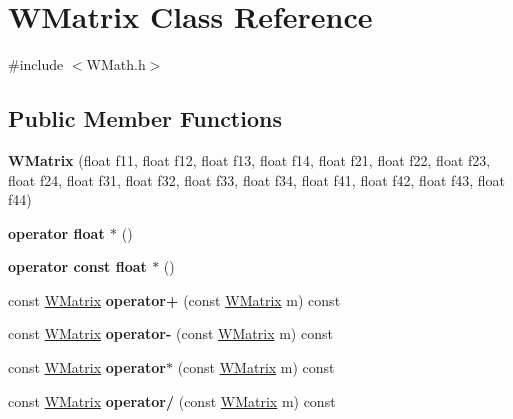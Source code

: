 \hypertarget{class_w_matrix}{}\section{W\+Matrix Class Reference}
\label{class_w_matrix}


{\ttfamily \#include $<$W\+Math.\+h$>$}

\subsection*{Public Member Functions}
\begin{DoxyCompactItemize}
\item 
{\bfseries W\+Matrix} (float f11, float f12, float f13, float f14, float f21, float f22, float f23, float f24, float f31, float f32, float f33, float f34, float f41, float f42, float f43, float f44)\hypertarget{class_w_matrix_aa626cd0267ca4e98fbf9672091613146}{}\label{class_w_matrix_aa626cd0267ca4e98fbf9672091613146}

\item 
{\bfseries operator float $\ast$} ()\hypertarget{class_w_matrix_a47199ab3ac019f3fba3f02369f2c3748}{}\label{class_w_matrix_a47199ab3ac019f3fba3f02369f2c3748}

\item 
{\bfseries operator const float $\ast$} ()\hypertarget{class_w_matrix_aa2aa5bec5b3684a351d92a3ec847be09}{}\label{class_w_matrix_aa2aa5bec5b3684a351d92a3ec847be09}

\item 
const \hyperlink{class_w_matrix}{W\+Matrix} {\bfseries operator+} (const \hyperlink{class_w_matrix}{W\+Matrix} m) const \hypertarget{class_w_matrix_a4c54b602a9a8d5df9e7967516da9fe37}{}\label{class_w_matrix_a4c54b602a9a8d5df9e7967516da9fe37}

\item 
const \hyperlink{class_w_matrix}{W\+Matrix} {\bfseries operator-\/} (const \hyperlink{class_w_matrix}{W\+Matrix} m) const \hypertarget{class_w_matrix_aa3cff5673c4904d75eb3c4224773be8f}{}\label{class_w_matrix_aa3cff5673c4904d75eb3c4224773be8f}

\item 
const \hyperlink{class_w_matrix}{W\+Matrix} {\bfseries operator$\ast$} (const \hyperlink{class_w_matrix}{W\+Matrix} m) const \hypertarget{class_w_matrix_ac974d1a20acec0e6759f34091521b47f}{}\label{class_w_matrix_ac974d1a20acec0e6759f34091521b47f}

\item 
const \hyperlink{class_w_matrix}{W\+Matrix} {\bfseries operator/} (const \hyperlink{class_w_matrix}{W\+Matrix} m) const \hypertarget{class_w_matrix_aee12db71d36897e441457066d5f17a8e}{}\label{class_w_matrix_aee12db71d36897e441457066d5f17a8e}


\end{DoxyCompactItemize}
